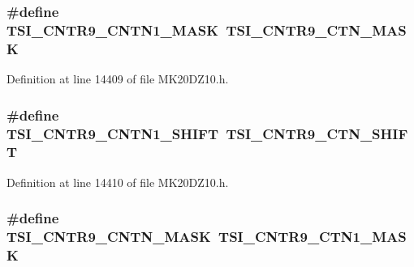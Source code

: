 \subsubsection[{\texorpdfstring{T\+S\+I\+\_\+\+C\+N\+T\+R9\+\_\+\+C\+N\+T\+N1\+\_\+\+M\+A\+SK}{TSI_CNTR9_CNTN1_MASK}}]{\setlength{\rightskip}{0pt plus 5cm}\#define T\+S\+I\+\_\+\+C\+N\+T\+R9\+\_\+\+C\+N\+T\+N1\+\_\+\+M\+A\+SK~{\bf T\+S\+I\+\_\+\+C\+N\+T\+R9\+\_\+\+C\+T\+N\+\_\+\+M\+A\+SK}}\hypertarget{group___backward___compatibility___symbols_ga4beb2ac7fbf0f1664b2369c399e900af}{}\label{group___backward___compatibility___symbols_ga4beb2ac7fbf0f1664b2369c399e900af}


Definition at line 14409 of file M\+K20\+D\+Z10.\+h.

\subsubsection[{\texorpdfstring{T\+S\+I\+\_\+\+C\+N\+T\+R9\+\_\+\+C\+N\+T\+N1\+\_\+\+S\+H\+I\+FT}{TSI_CNTR9_CNTN1_SHIFT}}]{\setlength{\rightskip}{0pt plus 5cm}\#define T\+S\+I\+\_\+\+C\+N\+T\+R9\+\_\+\+C\+N\+T\+N1\+\_\+\+S\+H\+I\+FT~{\bf T\+S\+I\+\_\+\+C\+N\+T\+R9\+\_\+\+C\+T\+N\+\_\+\+S\+H\+I\+FT}}\hypertarget{group___backward___compatibility___symbols_gad507b4ce5e4919c95c6a411bf21e73e7}{}\label{group___backward___compatibility___symbols_gad507b4ce5e4919c95c6a411bf21e73e7}


Definition at line 14410 of file M\+K20\+D\+Z10.\+h.

\subsubsection[{\texorpdfstring{T\+S\+I\+\_\+\+C\+N\+T\+R9\+\_\+\+C\+N\+T\+N\+\_\+\+M\+A\+SK}{TSI_CNTR9_CNTN_MASK}}]{\setlength{\rightskip}{0pt plus 5cm}\#define T\+S\+I\+\_\+\+C\+N\+T\+R9\+\_\+\+C\+N\+T\+N\+\_\+\+M\+A\+SK~{\bf T\+S\+I\+\_\+\+C\+N\+T\+R9\+\_\+\+C\+T\+N1\+\_\+\+M\+A\+SK}}\hypertarget{group___backward___compatibility___symbols_ga606767240c6f235dd70f977c5159a139}{}\label{group___backward___compatibility___symbols_ga606767240c6f235dd70f977c5159a139}


